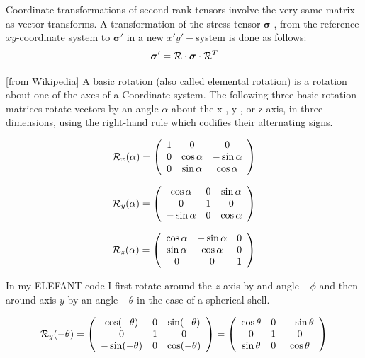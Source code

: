 Coordinate transformations of second-rank tensors involve the very same   
matrix as vector transforms. A transformation of the stress tensor ${\bm \sigma}$ ,
from the reference $xy$-coordinate system to ${\bm \sigma}'$ in a new $x'y'-$system is done as follows:
\[
{\bm \sigma}'={\cal R}\cdot {\bm \sigma}\cdot{\cal R}^T
\]



[from Wikipedia] A basic rotation (also called elemental rotation) is a rotation about one of the axes of a Coordinate system. 
The following three basic rotation matrices rotate vectors by an angle $\alpha$ 
about the x-, y-, or z-axis, in three dimensions, using the right-hand rule which codifies their 
alternating signs. 

\[
{\cal R}_x(\alpha)=
\left(
\begin{array}{ccc}
1 & 0 & 0 \\
0 & \cos\alpha & -\sin\alpha \\
0 & \sin\alpha & \cos\alpha
\end{array}
\right)
\]

\[
{\cal R}_y(\alpha)=
\left(
\begin{array}{ccc}
\cos\alpha & 0 & \sin\alpha \\
0 & 1 & 0 \\
-\sin\alpha & 0 &\cos\alpha
\end{array}
\right)
\]

\[
{\cal R}_z(\alpha)=
\left(
\begin{array}{ccc}
\cos\alpha & -\sin\alpha & 0\\
\sin\alpha & \cos\alpha & 0 \\
0 & 0 & 1 
\end{array}
\right)
\]

In my ELEFANT code I first rotate around the $z$ axis by and angle $-\phi$ and then 
around axis $y$ by an angle $-\theta$ in the case of a spherical shell.

\[
{\cal R}_y(-\theta)=
\left(
\begin{array}{ccc}
\cos(-\theta) & 0 & \sin(-\theta) \\
0 & 1 & 0 \\
-\sin(-\theta) & 0 &\cos(-\theta)
\end{array}
\right)
=
\left(
\begin{array}{ccc}
\cos\theta & 0 & -\sin\theta \\
0 & 1 & 0 \\
\sin\theta & 0 &\cos\theta
\end{array}
\right)
\]


